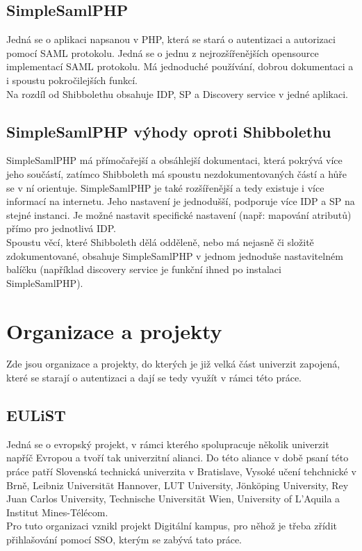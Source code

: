 \section{SimpleSamlPHP} %

Jedná se o aplikaci napsanou v PHP, která se stará o autentizaci a autorizaci pomocí SAML protokolu. Jedná se o jednu z nejrozšířenějších opensource implementací SAML protokolu. Má jednoduché používání, dobrou dokumentaci a i spoustu pokročilejších funkcí.\cite{simplesamlphpdoc}
\\
Na rozdíl od Shibbolethu obsahuje IDP, SP a Discovery service v jedné aplikaci.

\section{SimpleSamlPHP výhody oproti Shibbolethu} %

SimpleSamlPHP má přímočařejší a obsáhlejší dokumentaci, která pokrývá více jeho součástí, zatímco Shibboleth má spoustu nezdokumentovaných částí a hůře se v ní orientuje. SimpleSamlPHP je také rozšířenější a tedy existuje i více informací na internetu. Jeho nastavení je jednodušší, podporuje více IDP a SP na stejné instanci. Je možné nastavit specifické nastavení (např: mapování atributů) přímo pro jednotlivá IDP.\\ 
Spoustu věcí, které Shibboleth dělá odděleně, nebo má nejasně či složitě zdokumentované, obsahuje SimpleSamlPHP v jednom jednoduše nastavitelném balíčku (například discovery service je funkční ihned po instalaci SimpleSamlPHP). 

\chapter{Organizace a projekty} %

Zde jsou organizace a projekty, do kterých je již velká část univerzit zapojená, které se starají o autentizaci a dají se tedy využít v rámci této práce.

\section{EULiST} %
Jedná se o evropský projekt, v rámci kterého spolupracuje několik univerzit napříč Evropou a tvoří tak univerzitní alianci. Do této aliance v době psaní této práce patří Slovenská technická univerzita v Bratislave, Vysoké učení tehchnické v Brně,  Leibniz Universität Hannover, LUT University, Jönköping University, Rey Juan Carlos University, Technische Universität Wien, University of L’Aquila a Institut Mines-Télécom.\cite{eulist}
\\
Pro tuto organizaci vznikl projekt Digitální kampus, pro něhož je třeba zřídit přihlašování pomocí SSO, kterým se zabývá tato práce.

